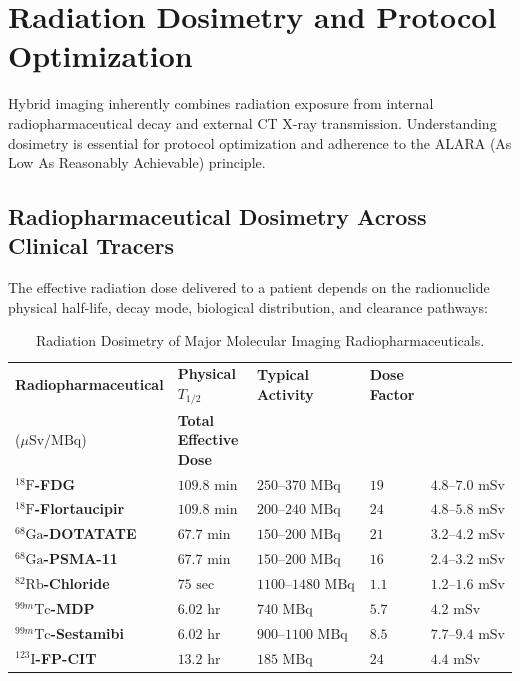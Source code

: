 \documentclass[11pt,a4paper]{article}
\begin{document}
\section{Radiation Dosimetry and Protocol Optimization}
Hybrid imaging inherently combines radiation exposure from internal radiopharmaceutical decay and external CT X-ray transmission. Understanding dosimetry is essential for protocol optimization and adherence to the ALARA (As Low As Reasonably Achievable) principle.

\subsection{Radiopharmaceutical Dosimetry Across Clinical Tracers}
The effective radiation dose delivered to a patient depends on the radionuclide physical half-life, decay mode, biological distribution, and clearance pathways:

\begin{table}[htbp]
\centering
\small
\setlength{\tabcolsep}{2.5pt}
\caption{Radiation Dosimetry of Major Molecular Imaging Radiopharmaceuticals.}
\label{tab:dosimetry}
\begin{tabular}{p{3.9cm} p{1.9cm} p{2.6cm} p{2.3cm} p{2.9cm}}
\toprule
\textbf{Radiopharmaceutical} & \textbf{Physical $T_{1/2}$} & \textbf{Typical Activity} & \textbf{Dose Factor}\\[-2pt]\footnotesize ($\mu\text{Sv/MBq}$) & \textbf{Total Effective Dose} \\
\midrule
\textbf{$^{18}\text{F}$-FDG} & $109.8\text{ min}$ & $250\text{--}370\text{ MBq}$ & $19$ & $4.8\text{--}7.0\text{ mSv}$ \\
\addlinespace
\textbf{$^{18}\text{F}$-Flortaucipir} & $109.8\text{ min}$ & $200\text{--}240\text{ MBq}$ & $24$ & $4.8\text{--}5.8\text{ mSv}$ \\
\addlinespace
\textbf{$^{68}\text{Ga}$-DOTATATE} & $67.7\text{ min}$ & $150\text{--}200\text{ MBq}$ & $21$ & $3.2\text{--}4.2\text{ mSv}$ \\
\addlinespace
\textbf{$^{68}\text{Ga}$-PSMA-11} & $67.7\text{ min}$ & $150\text{--}200\text{ MBq}$ & $16$ & $2.4\text{--}3.2\text{ mSv}$ \\
\addlinespace
\textbf{$^{82}\text{Rb}$-Chloride} & $75\text{ sec}$ & $1100\text{--}1480\text{ MBq}$ & $1.1$ & $1.2\text{--}1.6\text{ mSv}$ \\
\addlinespace
\textbf{$^{99m}\text{Tc}$-MDP} & $6.02\text{ hr}$ & $740\text{ MBq}$ & $5.7$ & $4.2\text{ mSv}$ \\
\addlinespace
\textbf{$^{99m}\text{Tc}$-Sestamibi} & $6.02\text{ hr}$ & $900\text{--}1100\text{ MBq}$ & $8.5$ & $7.7\text{--}9.4\text{ mSv}$ \\
\addlinespace
\textbf{$^{123}\text{I}$-FP-CIT} & $13.2\text{ hr}$ & $185\text{ MBq}$ & $24$ & $4.4\text{ mSv}$ \\
\bottomrule
\end{tabular}
\end{table}
\end{document}
